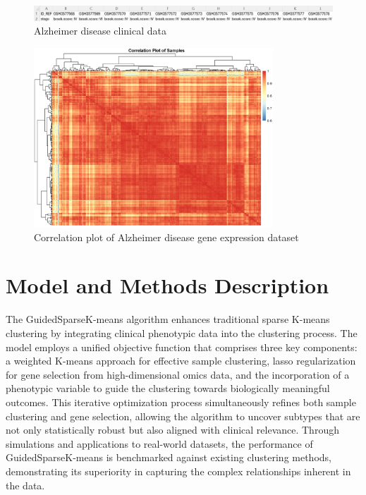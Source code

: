 \documentclass{statsoc}
\begin{document}
\begin{figure}[h!]
    \centering
    \includegraphics[width=\textwidth]{alzheimer_data.png}
    \caption{Alzheimer disease clinical data}
    \label{fig:alzheimer_data}
\end{figure}

\begin{figure}[h!]
    \centering
    \includegraphics[width=0.8\textwidth]{alzheimer_corr.png}
    \caption{Correlation plot of Alzheimer disease gene expression dataset}
    \label{fig:alzheimer_corr}
\end{figure}

\section{Model and Methods Description}

The GuidedSparseK-means algorithm enhances traditional sparse K-means clustering by integrating clinical phenotypic data into the clustering process. The model employs a unified objective function that comprises three key components: a weighted K-means approach for effective sample clustering, lasso regularization for gene selection from high-dimensional omics data, and the incorporation of a phenotypic variable to guide the clustering towards biologically meaningful outcomes. This iterative optimization process simultaneously refines both sample clustering and gene selection, allowing the algorithm to uncover subtypes that are not only statistically robust but also aligned with clinical relevance. Through simulations and applications to real-world datasets, the performance of GuidedSparseK-means is benchmarked against existing clustering methods, demonstrating its superiority in capturing the complex relationships inherent in the data.
\end{document}
